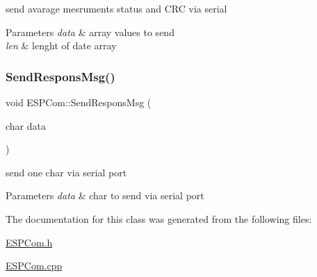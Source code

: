 send avarage mesruments status and C\+RC via serial 


\begin{DoxyParams}{Parameters}
{\em data} & array values to send \\
\hline
{\em len} & lenght of date array \\
\hline
\end{DoxyParams}
\mbox{\label{class_e_s_p_com_adb3506c54acc4b5101fccf1204b3796c}} 
\subsubsection{\texorpdfstring{Send\+Respons\+Msg()}{SendResponsMsg()}}
{\footnotesize\ttfamily void E\+S\+P\+Com\+::\+Send\+Respons\+Msg (\begin{DoxyParamCaption}\item[{char}]{data }\end{DoxyParamCaption})}



send one char via serial port 


\begin{DoxyParams}{Parameters}
{\em data} & char to send via serial port \\
\hline
\end{DoxyParams}


The documentation for this class was generated from the following files\+:\begin{DoxyCompactItemize}
\item 
\hyperlink{_e_s_p_com_8h}{E\+S\+P\+Com.\+h}\item 
\hyperlink{_e_s_p_com_8cpp}{E\+S\+P\+Com.\+cpp}\end{DoxyCompactItemize}
